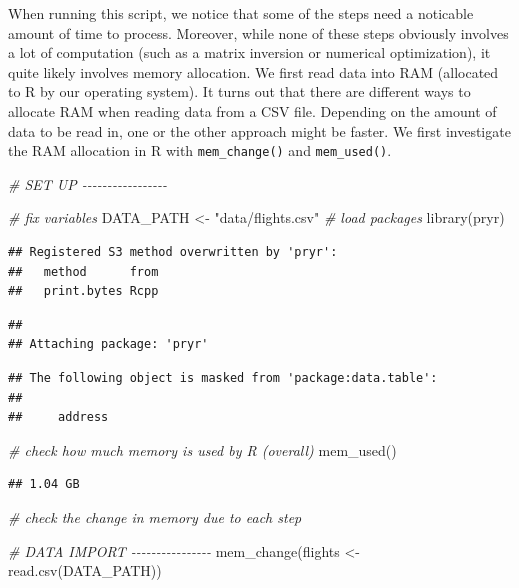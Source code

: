 \documentclass[
  12pt,
]{style/krantz}
\newenvironment{Shaded}{\begin{snugshade}}{\end{snugshade}}
\newcommand{\CommentTok}[1]{\textcolor[rgb]{0.56,0.35,0.01}{\textit{#1}}}
\newcommand{\FunctionTok}[1]{\textcolor[rgb]{0.00,0.00,0.00}{#1}}
\newcommand{\NormalTok}[1]{#1}
\newcommand{\OtherTok}[1]{\textcolor[rgb]{0.56,0.35,0.01}{#1}}
\newcommand{\StringTok}[1]{\textcolor[rgb]{0.31,0.60,0.02}{#1}}
\begin{document}
When running this script, we notice that some of the steps need a noticable amount of time to process. Moreover, while none of these steps obviously involves a lot of computation (such as a matrix inversion or numerical optimization), it quite likely involves memory allocation. We first read data into RAM (allocated to R by our operating system). It turns out that there are different ways to allocate RAM when reading data from a CSV file. Depending on the amount of data to be read in, one or the other approach might be faster. We first investigate the RAM allocation in R with \texttt{mem\_change()} and \texttt{mem\_used()}.

\begin{Shaded}
\begin{Highlighting}[]
\CommentTok{\# SET UP {-}{-}{-}{-}{-}{-}{-}{-}{-}{-}{-}{-}{-}{-}{-}{-}{-}}

\CommentTok{\# fix variables}
\NormalTok{DATA\_PATH }\OtherTok{\textless{}{-}} \StringTok{"data/flights.csv"}
\CommentTok{\# load packages}
\FunctionTok{library}\NormalTok{(pryr) }
\end{Highlighting}
\end{Shaded}

\begin{verbatim}
## Registered S3 method overwritten by 'pryr':
##   method      from
##   print.bytes Rcpp
\end{verbatim}

\begin{verbatim}
## 
## Attaching package: 'pryr'
\end{verbatim}

\begin{verbatim}
## The following object is masked from 'package:data.table':
## 
##     address
\end{verbatim}

\begin{Shaded}
\begin{Highlighting}[]
\CommentTok{\# check how much memory is used by R (overall)}
\FunctionTok{mem\_used}\NormalTok{()}
\end{Highlighting}
\end{Shaded}

\begin{verbatim}
## 1.04 GB
\end{verbatim}

\begin{Shaded}
\begin{Highlighting}[]
\CommentTok{\# check the change in memory due to each step}

\CommentTok{\# DATA IMPORT {-}{-}{-}{-}{-}{-}{-}{-}{-}{-}{-}{-}{-}{-}{-}{-}}
\FunctionTok{mem\_change}\NormalTok{(flights }\OtherTok{\textless{}{-}} \FunctionTok{read.csv}\NormalTok{(DATA\_PATH))}
\end{Highlighting}
\end{Shaded}
\end{document}
